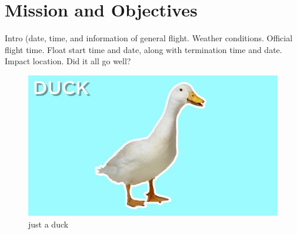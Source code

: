 \section{Mission and Objectives}
\label{sec:Introduction}

Intro (date, time, and information of general flight.  Weather conditions.  Official flight time.  Float start time and date, along with termination time and date.  Impact location.  Did it all go well?

\begin{figure}[h!]
  \begin{center}
    \begin{minipage}[c]{0.45\linewidth}
      \includegraphics[width=\textwidth]{./figures/duck.jpg}
      \caption{just a duck}
      \label{fig:duck}
    \end{minipage}


\end{center}
\end{figure}
